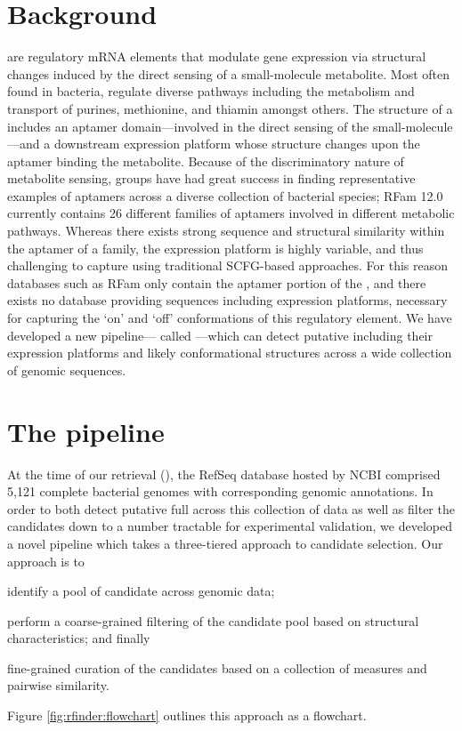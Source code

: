 \section{Background}
\label{sec:rfinder:bkgrnd}

\Rbs are regulatory mRNA elements that modulate gene expression via
structural changes induced by the direct sensing of a small-molecule metabolite.
Most often found in bacteria, \rbs regulate diverse pathways including the
metabolism and transport of purines, methionine, and thiamin amongst others. The
structure of a \rb includes an aptamer domain---involved in the direct
sensing of the small-molecule---and a downstream expression platform whose
structure changes upon the aptamer binding the metabolite. Because of the
discriminatory nature of metabolite sensing, groups have had great success in
finding representative examples of aptamers across a diverse collection of
bacterial species; RFam 12.0 currently contains 26 different families of aptamers
involved in different metabolic pathways. Whereas there exists strong sequence and
structural similarity within the aptamer of a \rb family, the expression
platform is highly variable, and thus challenging to capture using traditional
SCFG-based approaches. For this reason databases such as RFam only contain the aptamer
portion of the \rb, and there exists no database providing sequences
including expression platforms, necessary for capturing the `on' and `off'
conformations of this regulatory element. We have developed a new pipeline---
called \rfinder---which can detect putative \rbs including their
expression platforms and likely conformational structures across a wide collection
of genomic sequences.

\section{The \rfinder pipeline}
\label{sec:rfinder:pipeline}

At the time of our retrieval (\fnaRetrievalTime), the RefSeq database hosted by
NCBI comprised 5,121 complete bacterial genomes with corresponding genomic
annotations. In order to both detect putative full \rbs across this
collection of data as well as filter the candidates down to a number tractable for
experimental validation, we developed a novel pipeline which takes a three-tiered
approach to candidate selection. Our approach is to
\begin{inparaenum}[\em 1\upshape)]
\item identify a pool of candidate \rbs across genomic data;
\item perform a coarse-grained filtering of the candidate pool based on structural
characteristics; and finally
\item fine-grained curation of the candidates based on a collection of measures
and pairwise similarity.
\end{inparaenum} Figure \ref{fig:rfinder:flowchart} outlines this approach as a
flowchart.

